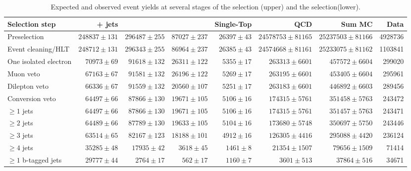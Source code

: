 \begin{table}
  \centering
   \caption{Expected and observed event yields at several stages of the \eplusjets selection (upper) and the
   \muplusjets selection(lower).}
    \label{tab:cut_flow_7TeV}
    \resizebox{\columnwidth}{!} {
    \begin{tabular}{lrrrrrrr}
    \hline
    \hline
	Selection step & \ttbar + jets & \WpJets & \ZpJets & Single-Top & QCD & Sum MC & Data \\
	\hline
	Preselection  &  $248837 \pm 131$ &  $296487 \pm 255$ &  $87027 \pm 237$ &  $26397 \pm 43$ &  $24578753 \pm 81165$ &  $25237503 \pm 81166$ &  4928736 \\ 
	Event cleaning/HLT  &  $248712 \pm 131$ &  $296343 \pm 255$ &  $86964 \pm 237$ &  $26385 \pm 43$ &  $24574668 \pm 81161$ &  $25233075 \pm 81162$ &  1103841 \\ 
	One isolated electron  &  $70973 \pm 69$ &  $91618 \pm 132$ &  $26311 \pm 122$ &  $5355 \pm 17$ &  $263313 \pm 6601$ &  $457572 \pm 6604$ &  299020 \\ 
	Muon veto  &  $67163 \pm 67$ &  $91581 \pm 132$ &  $26196 \pm 122$ &  $5269 \pm 17$ &  $263195 \pm 6601$ &  $453405 \pm 6604$ &  295961 \\ 
	Dilepton veto  &  $66336 \pm 67$ &  $91559 \pm 132$ &  $20560 \pm 107$ &  $5251 \pm 17$ &  $263183 \pm 6601$ &  $446892 \pm 6603$ &  289456 \\ 
	Conversion veto  &  $64497 \pm 66$ &  $87866 \pm 130$ &  $19671 \pm 105$ &  $5106 \pm 16$ &  $174315 \pm 5761$ &  $351458 \pm 5763$ &  243472 \\ 
	$\geq 1$ jets  &  $64497 \pm 66$ &  $87866 \pm 130$ &  $19671 \pm 105$ &  $5106 \pm 16$ &  $174315 \pm 5761$ &  $351457 \pm 5763$ &  243471 \\ 
	$\geq 2$ jets  &  $64489 \pm 66$ &  $87789 \pm 130$ &  $19633 \pm 105$ &  $5104 \pm 16$ &  $173680 \pm 5748$ &  $350697 \pm 5750$ &  243446 \\ 
	$\geq 3$ jets  &  $63514 \pm 65$ &  $82167 \pm 123$ &  $18188 \pm 101$ &  $4912 \pm 16$ &  $126305 \pm 4416$ &  $295088 \pm 4420$ &  236124 \\ 
	$\geq 4$ jets  &  $35285 \pm 48$ &  $17935 \pm 42$ &  $3618 \pm 45$ &  $1461 \pm 8$ &  $21354 \pm 1507$ &  $79656 \pm 1509$ &  71414 \\ 
	$\geq 1$ b-tagged jets  &  $29777 \pm 44$ &  $2764 \pm 17$ &  $562 \pm 17$ &  $1160 \pm 7$ &  $3601 \pm 513$ &  $37864 \pm 516$ &  34671 \\ 

\end{tabular}}
\end{table}
